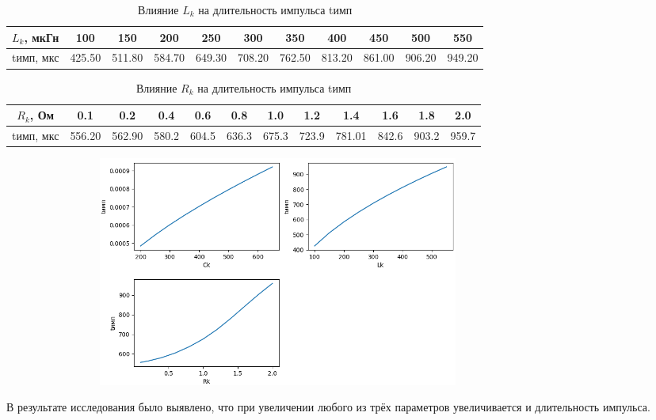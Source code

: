 \begin{enumerate}
	\begin{table}[ph!]\label{table_4}
		\caption{Влияние $L_k$ на длительность импульса tимп}
		\centering
		\begin{tabular}{|c|c|c|c|c|c|c|c|c|c|c|}
			\hline
			$L_k$, мкГн & 100 & 150 & 200 & 250 & 300 & 350 & 400 & 450 & 500 & 550 \\
			\hline
			tимп, мкс & 425.50 & 511.80 & 584.70 & 649.30 & 708.20 & 762.50 & 813.20 & 861.00 & 906.20 & 949.20\\
			\hline	
		\end{tabular}
	\end{table}
	
	\begin{table}[ph!]\label{table_5}
		\caption{Влияние $R_k$ на длительность импульса tимп}
		\centering
		\begin{tabular}{|c|c|c|c|c|c|c|c|c|c|c|c|}
			\hline
			$R_k$, Ом & 0.1 & 0.2 & 0.4 & 0.6 & 0.8 & 1.0 & 1.2 & 1.4 & 1.6 & 1.8 & 2.0 \\
			\hline
			tимп, мкс & 556.20 & 562.90 & 580.2 & 604.5 & 636.3 & 675.3 & 723.9 & 781.01 & 842.6 & 903.2 & 959.7\\
			\hline	
		\end{tabular}
	\end{table}
	
	\begin{figure}[ph!]
		\begin{center}
			{\includegraphics[height=7.58cm, width = 16cm]{tasks/task_4}}
		\end{center}
	\end{figure}
	В результате исследования было выявлено, что при увеличении любого из трёх параметров увеличивается и длительность импульса.
	
\end{enumerate}